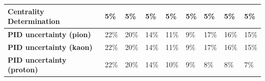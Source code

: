 \begin{table}[hp]
{\begin{tabular}{lllllllll}
\multicolumn{1}{|l||}{\textbf{Centrality Determination}}                & \multicolumn{1}{l|}{5\%}                                      & \multicolumn{1}{l|}{5\%}                                      & \multicolumn{1}{l|}{5\%}                                      & \multicolumn{1}{l|}{5\%}                                      & \multicolumn{1}{l|}{5\%}                                      & \multicolumn{1}{l|}{5\%}                                      & \multicolumn{1}{l|}{5\%}                                      & \multicolumn{1}{l|}{5\%}                                      \\ \hline
\multicolumn{1}{|l||}{\textbf{PID uncertainty (pion)}}                  & \multicolumn{1}{l|}{22\%}                                     & \multicolumn{1}{l|}{20\%}                                     & \multicolumn{1}{l|}{14\%}                                     & \multicolumn{1}{l|}{11\%}                                     & \multicolumn{1}{l|}{9\%}                                      & \multicolumn{1}{l|}{17\%}                                     & \multicolumn{1}{l|}{16\%}                                     & \multicolumn{1}{l|}{15\%}                                     \\ \hline
\multicolumn{1}{|l||}{\textbf{PID uncertainty (kaon)}}                  & \multicolumn{1}{l|}{22\%}                                     & \multicolumn{1}{l|}{20\%}                                     & \multicolumn{1}{l|}{14\%}                                     & \multicolumn{1}{l|}{11\%}                                     & \multicolumn{1}{l|}{9\%}                                      & \multicolumn{1}{l|}{17\%}                                     & \multicolumn{1}{l|}{16\%}                                     & \multicolumn{1}{l|}{15\%}                                     \\ \hline
\multicolumn{1}{|l||}{\textbf{PID uncertainty (proton)}}                & \multicolumn{1}{l|}{22\%}                                     & \multicolumn{1}{l|}{20\%}                                     & \multicolumn{1}{l|}{14\%}                                     & \multicolumn{1}{l|}{10\%}                                     & \multicolumn{1}{l|}{9\%}                                      & \multicolumn{1}{l|}{8\%}                                      & \multicolumn{1}{l|}{8\%}                                      & \multicolumn{1}{l|}{7\%}                                      \\ \hline
\end{tabular}}


\end{table}
